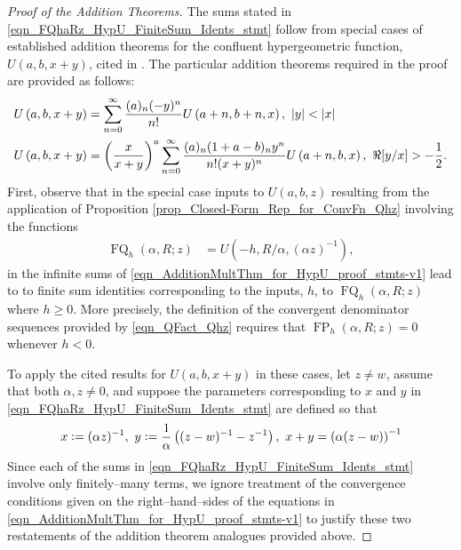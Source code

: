 \documentclass[12pt,reqno]{article}
\numberwithin{sfootnote}{section}
\numberwithin{equation}{section}
\theoremstyle{plain}
\theoremstyle{definition}
\theoremstyle{remark}
\newcommand{\defequals}{\ensuremath{\vcentcolon=}}
\newcommand{\HypU}[3]{\ensuremath{U\left(#1, #2, #3\right)}}
\DeclareMathOperator{\FP}{FP}
\DeclareMathOperator{\FQ}{FQ}
\begin{document}
\begin{proof}[Proof of the Addition Theorems] 
The sums stated in \eqref{eqn_FQhaRz_HypU_FiniteSum_Idents_stmt} 
follow from special cases of established addition theorems for the 
confluent hypergeometric function, $\HypU{a}{b}{x+y}$, cited in 
\citep[\S 13.13(ii)]{NISTHB}. 
The particular addition theorems required in the proof are 
provided as follows: 
\begin{align} 
\label{eqn_AdditionMultThm_for_HypU_proof_stmts-v1} 
\HypU{a}{b}{x+y} & = \sum_{n=0}^{\infty} \frac{(a)_n (-y)^n}{n!} 
     \HypU{a+n}{b+n}{x},\ |y| < |x| \\ 
\notag 
\HypU{a}{b}{x+y} & = \left(\frac{x}{x+y}\right)^{a} \sum_{n=0}^{\infty} 
     \frac{(a)_n (1+a-b)_n y^n}{n! (x+y)^n} \HypU{a+n}{b}{x},\ 
     \Re[y / x] > -\frac{1}{2}. 
\end{align} 
First, 
observe that in the special case inputs to $\HypU{a}{b}{z}$ 
resulting from the application of 
Proposition \ref{prop_Closed-Form_Rep_for_ConvFn_Qhz} 
involving the functions 
\begin{align*} 
\FQ_h(\alpha, R; z) & = \HypU{-h}{R / \alpha}{(\alpha z)^{-1}}, 
\end{align*} 
in the infinite sums of 
\eqref{eqn_AdditionMultThm_for_HypU_proof_stmts-v1} 
lead to to finite sum identities corresponding to the inputs, $h$, to 
$\FQ_h(\alpha, R; z)$ where $h \geq 0$. 
More precisely, the definition of the convergent denominator sequences 
provided by \eqref{eqn_QFact_Qhz} requires that 
$\FP_h(\alpha, R; z) = 0$ whenever $h < 0$. 

To apply the cited results for $\HypU{a}{b}{x+y}$ in these cases, 
let $z \neq w$, assume that both $\alpha, z \neq 0$, and 
suppose the parameters corresponding to $x$ and $y$ 
in \eqref{eqn_FQhaRz_HypU_FiniteSum_Idents_stmt} are defined so that 
\begin{equation} 
\label{eqn_AdditionMultThm_analogues_proof_stmt-v1} 
x \defequals (\alpha z)^{-1},\ 
y \defequals \frac{1}{\alpha}\left((z-w)^{-1} - z^{-1}\right),\ 
x + y = \left(\alpha (z-w)\right)^{-1} 
\end{equation} 
Since each of the sums in \eqref{eqn_FQhaRz_HypU_FiniteSum_Idents_stmt} 
involve only finitely--many terms, 
we ignore treatment of the convergence conditions given on the 
right--hand--sides of the equations in 
\eqref{eqn_AdditionMultThm_for_HypU_proof_stmts-v1} 
to justify these two restatements of the addition theorem analogues 
provided above. 
\end{proof} 
\end{document}
